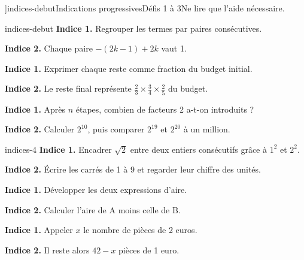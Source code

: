 \editionPage[\pdfbookmark[0]{Indications des défis}{bm-indices-debut-parent}]{indices-debut}{Indications progressives}{Défis 1 à 3}{Ne lire que l’aide nécessaire.}
\begin{blocEdition}{indices-debut}
\textbf{Indice 1.} Regrouper les termes par paires consécutives.\par\medskip\textbf{Indice 2.} Chaque paire $-(2k-1)+2k$ vaut 1.\par
{}\textbf{Indice 1.} Exprimer chaque reste comme fraction du budget initial.\par\medskip\textbf{Indice 2.} Le reste final représente $\frac23\times\frac34\times\frac25$ du budget.\par
{}\textbf{Indice 1.} Après $n$ étapes, combien de facteurs 2 a-t-on introduits ?\par\medskip\textbf{Indice 2.} Calculer $2^{10}$, puis comparer $2^{19}$ et $2^{20}$ à un million.\par

\end{blocEdition}
\begin{blocEdition}{indices-4}
\textbf{Indice 1.} Encadrer $\sqrt2$ entre deux entiers consécutifs grâce à $1^2$ et $2^2$.\par\medskip\textbf{Indice 2.} Écrire les carrés de 1 à 9 et regarder leur chiffre des unités.\par
{}\textbf{Indice 1.} Développer les deux expressions d’aire.\par\medskip\textbf{Indice 2.} Calculer l’aire de A moins celle de B.\par
{}\textbf{Indice 1.} Appeler $x$ le nombre de pièces de 2 euros.\par\medskip\textbf{Indice 2.} Il reste alors $42-x$ pièces de 1 euro.\par

\end{blocEdition}
